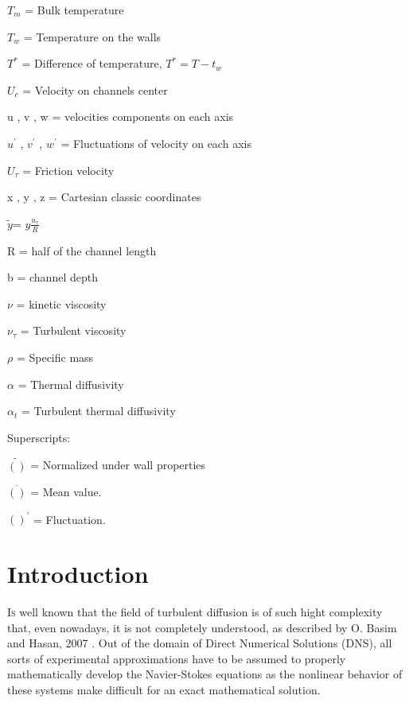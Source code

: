 \documentclass[10pt]{article} %
\begin{document}
	
	
	
	$T_m$ = Bulk temperature 
	
	
	
	
	$T_w$ = Temperature on the walls
	
	
	
	
	$T^\ast$ = Difference of temperature, $T^\ast = T - t_w $ 
	
	
	
	
	${U}_c$ = Velocity on channels center
	
	
	
	u , v , w = velocities components on each axis
	
	
	$u^\prime $ , $ v^\prime $ , $ w^\prime $ = Fluctuations of velocity on each axis
	
	
	$U_\tau$ = Friction velocity
	
	
	x , y , z = Cartesian classic coordinates
	
	
	$\tilde{y} $= $ y \frac{u_\tau}{R} $
	
	
	R = half of the channel length
	
	
	
	b = channel depth
	
	
	
	$\nu$ = kinetic viscosity
	
	
	$\nu_\tau$ = Turbulent viscosity
	
	
	$\rho$ = Specific mass
	
	
	$\alpha$ = Thermal diffusivity
	
	
	$\alpha_t$ = Turbulent thermal diffusivity 
	
	\vspace{8.00mm}
	
	\begin{LARGE}
		Superscripts: 
	\end{LARGE} 
	
	$\tilde{()}$ = Normalized under wall properties
	
	$\overline{()}$ = Mean value.
	 
	$()^\prime$ = Fluctuation. 


\section{Introduction}

\lettrine[nindent=0em,lines=2]{I}s well known that the field of turbulent diffusion is of such hight complexity that, even nowadays, it is not completely understood, as described by O. Basim and Hasan, 2007 \cite{hasan}. Out of the domain of Direct Numerical Solutions (DNS), all sorts of experimental approximations have to be assumed to properly mathematically develop the Navier-Stokes equations as the nonlinear behavior of these systems \cite{John} make difficult for an exact mathematical solution. 
\end{document}
